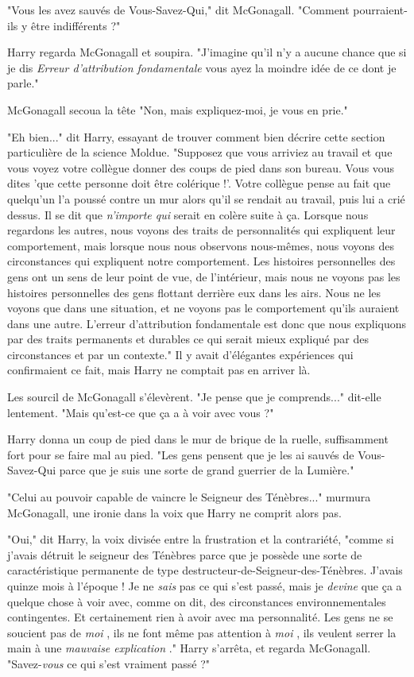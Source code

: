 "Vous les avez sauvés de Vous-Savez-Qui," dit McGonagall. "Comment pourraient-ils y être indifférents ?"

Harry regarda McGonagall et soupira. "J'imagine qu'il n'y a aucune chance que si je dis \emph{Erreur d'attribution fondamentale}  vous ayez la moindre idée de ce dont je parle."

McGonagall secoua la tête "Non, mais expliquez-moi, je vous en prie."

"Eh bien..." dit Harry, essayant de trouver comment bien décrire cette section particulière de la science Moldue. "Supposez que vous arriviez au travail et que vous voyez votre collègue donner des coups de pied dans son bureau. Vous vous dites 'que cette personne doit être colérique !'. Votre collègue pense au fait que quelqu'un l'a poussé contre un mur alors qu'il se rendait au travail, puis lui a crié dessus. Il se dit que \emph{n'importe qui}  serait en colère suite à ça. Lorsque nous regardons les autres, nous voyons des traits de personnalités qui expliquent leur comportement, mais lorsque nous nous observons nous-mêmes, nous voyons des circonstances qui expliquent notre comportement. Les histoires personnelles des gens ont un sens de leur point de vue, de l'intérieur, mais nous ne voyons pas les histoires personnelles des gens flottant derrière eux dans les airs. Nous ne les voyons que dans une situation, et ne voyons pas le comportement qu'ils auraient dans une autre. L'erreur d'attribution fondamentale est donc que nous expliquons par des traits permanents et durables ce qui serait mieux expliqué par des circonstances et par un contexte." Il y avait d'élégantes expériences qui confirmaient ce fait, mais Harry ne comptait pas en arriver là.

Les sourcil de McGonagall s'élevèrent. "Je pense que je comprends..." dit-elle lentement. "Mais qu'est-ce que ça a à voir avec vous ?"

Harry donna un coup de pied dans le mur de brique de la ruelle, suffisamment fort pour se faire mal au pied. "Les gens pensent que je les ai sauvés de Vous-Savez-Qui parce que je suis une sorte de grand guerrier de la Lumière."

"Celui au pouvoir capable de vaincre le Seigneur des Ténèbres..." murmura McGonagall, une ironie dans la voix que Harry ne comprit alors pas.

"Oui," dit Harry, la voix divisée entre la frustration et la contrariété, "comme si j'avais détruit le seigneur des Ténèbres parce que je possède une sorte de caractéristique permanente de type destructeur-de-Seigneur-des-Ténèbres. J'avais quinze mois à l'époque ! Je ne \emph{sais}  pas ce qui s'est passé, mais je \emph{devine}  que ça a quelque chose à voir avec, comme on dit, des circonstances environnementales contingentes. Et certainement rien à avoir avec ma personnalité. Les gens ne se soucient pas de \emph{moi} , ils ne font même pas attention à \emph{moi} , ils veulent serrer la main à une \emph{mauvaise explication} ." Harry s'arrêta, et regarda McGonagall. "Savez-\emph{vous}  ce qui s'est vraiment passé ?"

